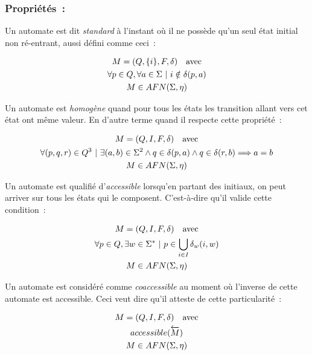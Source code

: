 \vphantom{}

\subsubsection*{Propriétés~:}

Un automate est dit \textit{standard} à l'instant où il ne possède qu'un seul
état initial non ré-entrant, aussi défini comme ceci~:

\begin{gather}
    M = (Q, \{i\}, F, \delta) \quad \text{avec} \\
    \forall p \in Q, \forall a \in \Sigma ~|~ i \notin \delta(p, a) \notag \\
    M \in AFN(\Sigma, \eta) \notag
\end{gather}

Un automate est \textit{homogène} quand pour tous les états les transition
allant vers cet état ont même valeur. En d'autre terme quand il respecte cette
propriété~:

\begin{gather}
    M = (Q, I, F, \delta) \quad \text{avec} \\
    \forall (p, q, r) \in Q^3 ~|~ \exists (a, b) \in \Sigma^2 \land q \in \delta(p, a) \land q \in \delta(r, b) \Longrightarrow a = b \notag \\
    M \in AFN(\Sigma, \eta) \notag
\end{gather}

Un automate est qualifié d'\textit{accessible} lorsqu'en partant des initiaux,
on peut arriver sur tous les états qui le composent. C'est-à-dire qu'il valide
cette condition~:

\begin{gather}
    M = (Q, I, F, \delta) \quad \text{avec} \\
    \forall p \in Q, \exists w \in \Sigma^* ~|~ p \in \bigcup_{i \in I} \delta_w(i, w) \notag \\
    M \in AFN(\Sigma, \eta) \notag
\end{gather}

Un automate est considéré comme \textit{coaccessible} au moment où l'inverse de
cette automate est accessible. Ceci veut dire qu'il atteste de cette
particularité~:

\begin{gather}
    M = (Q, I, F, \delta) \quad \text{avec} \\
    accessible(\overleftarrow{M}) \notag \\
    M \in AFN(\Sigma, \eta) \notag
\end{gather}

